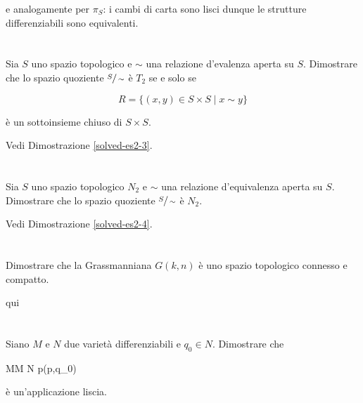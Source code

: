 e analogamente per $ \pi_{S} $: i cambi di carta sono lisci dunque le strutture differenziabili sono equivalenti.

\tocless\section{}\label{es2-3}

\begin{tcolorbox}
	Sia $ S $ uno spazio topologico e $ \sim $ una relazione d'evalenza aperta su $ S $. Dimostrare che lo spazio quoziente $ \sfrac{S}{\sim} $ è $ T_{2} $ se e solo se
	
	\begin{equation}
		R = \{ (x,y) \in S \times S \mid x \sim y \}
	\end{equation}
	
	è un sottoinsieme chiuso di $ S \times S $.
\end{tcolorbox}

Vedi Dimostrazione \ref{solved-es2-3}.

\tocless\section{}\label{es2-4}

\begin{tcolorbox}
	Sia $ S $ uno spazio topologico $ N_{2} $ e $ \sim $ una relazione d'equivalenza aperta su $ S $. Dimostrare che lo spazio quoziente $ \sfrac{S}{\sim} $ è $ N_{2} $.
\end{tcolorbox}

Vedi Dimostrazione \ref{solved-es2-4}.

\tocless\section{}\label{es2-5}

\begin{tcolorbox}
	Dimostrare che la Grassmanniana $ G(k,n) $ è uno spazio topologico connesso e compatto.
\end{tcolorbox}

qui

\tocless\section{}\label{es2-6}

\begin{tcolorbox}
	Siano $ M $ e $ N $ due varietà differenziabili e $ q_{0} \in N $. Dimostrare che
	
		{M}{M \times N}%
		{p}{(p,q_{0})}
	
	è un'applicazione liscia.
\end{tcolorbox}

